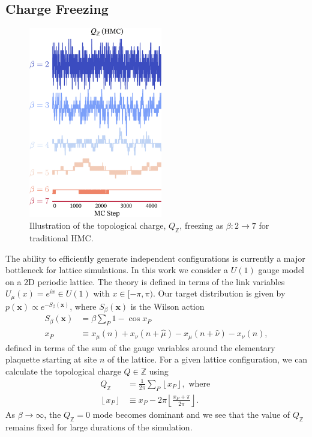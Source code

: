 \documentclass[a4paper,11pt]{article}
\newcommand{\x}{\mathbf{x}}
\begin{document}
\subsection{\label{subsec:qfreezing}Charge Freezing}
%
\begin{figure}
    \vspace{-\baselineskip}
    \centering
    \includegraphics[width=0.52\textwidth]{assets/qfreezing.pdf}
    \caption{\label{fig:qfreezing}Illustration of the topological charge,
      \(Q_{\mathbb{Z}}\), freezing as \(\beta : 2 \rightarrow 7\) for traditional HMC.}
\end{figure}
%
The ability to efficiently generate independent configurations is currently
a major bottleneck for lattice simulations.
%
In this work we consider a \(U(1)\) gauge model on a 2D periodic lattice.
%
The theory is defined in terms of the link variables
\(U_{\mu}(x) = e^{i x} \in U(1)\) with \(x \in [-\pi, \pi)\).
%
Our target distribution is given by \(p(\x)\propto e^{-S_{\beta}(\x)}\), where
\(S_{\beta}(\x)\) is the Wilson action
%
\begin{align}
  S_{\beta}(\x) &= \beta \sum_{P} 1 - \cos{x_{P}} \\
  x_{P} &\equiv x_{\mu}(n) + x_{\nu}(n + \hat{\mu})
    - x_{\mu}(n+\hat{\nu}) - x_{\nu}(n) ,
\end{align}
%
defined in terms of the sum of the gauge variables around the elementary plaquette
starting at site $n$ of the lattice.
%
For a given lattice configuration, we can calculate the topological charge \(Q
\in \mathbb{Z}\) using
%
\begin{align}
    Q_{\mathbb{Z}} &= \frac{1}{2\pi}\sum_{P}\left\lfloor x_{P} \right\rfloor,\text{ where } \\
    \left\lfloor x_{P} \right\rfloor &\equiv x_{P} - 2\pi
    \left\lfloor\frac{x_{P}+\pi}{2\pi}\right\rfloor.
\end{align}
%
As \(\beta \rightarrow \infty\), the \(Q_{\mathbb{Z}} = 0\) mode becomes
dominant and we see that the value of \(Q_\mathbb{Z}\) remains fixed for large
durations of the simulation.
%
\end{document}
